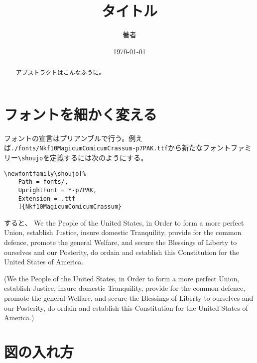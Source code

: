 \documentclass{ltjsarticle}
\author{著者}
\date{\和暦\today}
\title{タイトル}
\begin{document}
\maketitle
\tableofcontents
%
\begin{abstract}
    アブストラクトはこんなふうに。
\end{abstract}
%
%
\section{フォントを細かく変える}
フォントの宣言はプリアンブルで行う。例えば\verb|./fonts/Nkf10MagicumComicumCrassum-p7PAK.ttf|から新たなフォントファミリー\verb|\shoujo|を定義するには次のようにする。
\begin{verbatim}
\newfontfamily\shoujo[%
    Path = fonts/,
    UprightFont = *-p7PAK,
    Extension = .ttf
    ]{Nkf10MagicumComicumCrassum}
\end{verbatim}
すると、
{\shoujo We the People of the United States, in Order to form a more perfect Union, establish Justice, insure domestic Tranquility, provide for the common defence, promote the general Welfare, and secure the Blessings of Liberty to ourselves and our Posterity, do ordain and establish this Constitution for the United States of America.}

(We the People of the United States, in Order to form a more perfect Union, establish Justice, insure domestic Tranquility, provide for the common defence, promote the general Welfare, and secure the Blessings of Liberty to ourselves and our Posterity, do ordain and establish this Constitution for the United States of America\cite{UScontrib}.)

\section{図の入れ方}
%


\end{document}
